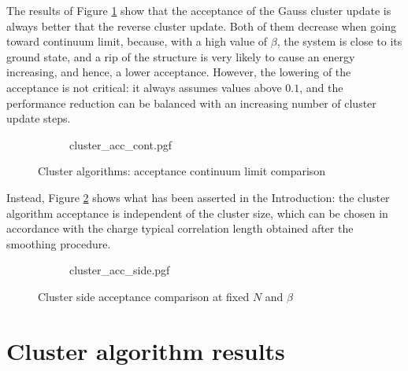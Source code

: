 The results of Figure \ref{fig:cluster_acc_cont} show that the acceptance of the Gauss cluster update is always better that the reverse cluster update.
Both of them decrease when going toward continuum limit, because, with a high value of $\beta$, the system is close to its ground state,
and a rip of the structure is very likely to cause an energy increasing, and hence, a lower acceptance.
However, the lowering of the acceptance is not critical: it always assumes values above $0.1$,
and the performance reduction can be balanced with an increasing number of cluster update steps.

\begin{figure}[!htb]
    \centering
    \begin{subfigure}{\textwidth}
        \centering
        {cluster_acc_cont.pgf}
    \end{subfigure}\vspace{1.5em}
    \begin{subfigure}{\textwidth}
        \centering
        
    \end{subfigure}
    \caption{Cluster algorithms: acceptance continuum limit comparison}
    \label{fig:cluster_acc_cont}
\end{figure}

Instead, Figure \ref{fig:cluster_acc_side} shows what has been asserted in the Introduction:
the cluster algorithm acceptance is independent of the cluster size,
which can be chosen in accordance with the charge typical correlation length obtained after the smoothing procedure.

\begin{figure}[!htb]
	\centering
    \begin{subfigure}{\textwidth}
        \centering
        {cluster_acc_side.pgf}
    \end{subfigure}\vspace{1.5em}
    \begin{subfigure}{\textwidth}
        \centering
        
    \end{subfigure}
    \caption{Cluster side acceptance comparison at fixed $N$ and $\beta$}
    \label{fig:cluster_acc_side}
\end{figure}

\section{Cluster algorithm results}


